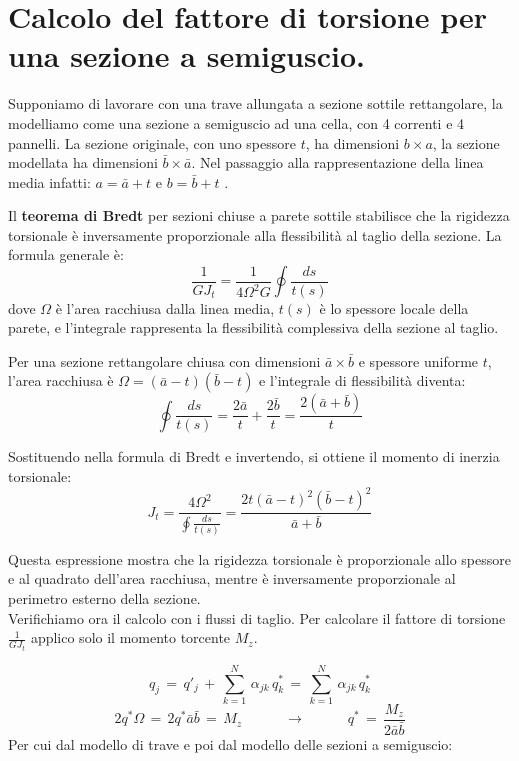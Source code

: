\section{Calcolo del fattore di torsione per una sezione a semiguscio.}

Supponiamo di lavorare con una trave allungata a sezione sottile rettangolare, la modelliamo come una sezione a semiguscio ad una cella, con 4 correnti e 4 pannelli. La sezione originale, con uno spessore $t$, ha dimensioni $b\times a$, la sezione modellata ha dimensioni $\bar{b}\times\bar{a}$. Nel passaggio alla rappresentazione della linea media infatti: $a = \bar{a}+t$ e $b = \bar{b}+t$ .

Il \textbf{teorema di Bredt} per sezioni chiuse a parete sottile stabilisce che la rigidezza torsionale è inversamente proporzionale alla flessibilità al taglio della sezione. La formula generale è:
\begin{equation*}
    \frac{1}{GJ_t} = \frac{1}{4\Omega^2 G} \oint \frac{ds}{t(s)}
\end{equation*}
dove $\Omega$ è l'area racchiusa dalla linea media, $t(s)$ è lo spessore locale della parete, e l'integrale rappresenta la flessibilità complessiva della sezione al taglio.

Per una sezione rettangolare chiusa con dimensioni $\bar{a} \times \bar{b}$ e spessore uniforme $t$, l'area racchiusa è $\Omega = (\bar{a}-t)(\bar{b}-t)$ e l'integrale di flessibilità diventa:
\begin{equation*}
    \oint \frac{ds}{t(s)} = \frac{2\bar{a}}{t} + \frac{2\bar{b}}{t} = \frac{2(\bar{a} + \bar{b})}{t}
\end{equation*}

Sostituendo nella formula di Bredt e invertendo, si ottiene il momento di inerzia torsionale:
\begin{equation*}
    J_t = \frac{4\Omega^2}{\oint \frac{ds}{t(s)}}  = \frac{2t(\bar{a}-t)^2(\bar{b}-t)^2}{\bar{a} + \bar{b}}
\end{equation*}

Questa espressione mostra che la rigidezza torsionale è proporzionale allo spessore e al quadrato dell'area racchiusa, mentre è inversamente proporzionale al perimetro esterno della sezione.\\
Verifichiamo ora il calcolo con i flussi di taglio. Per calcolare il fattore di torsione $\frac{1}{GJ_t}$ applico solo il momento torcente $M_z$.

\begin{equation*}
    q_j\,=\,q'_j\,+\,   \sum^N_{k=1}\,\alpha_{jk}\,q^*_k\,=\,   \sum^N_{k=1}\,\alpha_{jk}\,q^*_k
\end{equation*}
\begin{equation*}
    2q^*\Omega \,=\,  2q^*\bar{a} \bar{b}\,=\, M_z\quad\quad\quad\rightarrow\quad\quad\quad q^*\,=\,\frac{M_z}{2\bar{a} \bar{b}}
\end{equation*}
Per cui dal modello di trave e poi dal modello delle sezioni a semiguscio:

